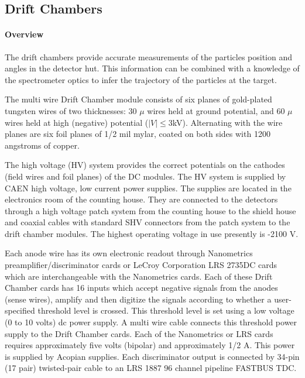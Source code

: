 \begin{obsolete}
\subsection{Drift Chambers}

\paragraph{Overview}

The drift chambers provide accurate measurements of the particles
position and angles in the detector hut. This information can be combined
with a knowledge of the spectrometer optics to infer the trajectory of the
particles at the target.

The multi wire Drift Chamber module consists of six planes of gold-plated
tungsten wires of two thicknesses: 30 $\mu$ wires held at ground
potential, and 60 $\mu$ wires held at high (negative) potential
($\left|V\right|\le3$kV).  Alternating with the wire planes are six
foil planes of 1/2 mil mylar, coated on both sides with 1200 angstroms
of copper.

The high voltage (HV) system provides the correct potentials on the
cathodes (field wires and foil planes) of the DC modules.  The HV
system is supplied by CAEN high voltage, low current power supplies.
The supplies are located in the electronics room of the counting
house. They are connected to the detectors through a high voltage patch
system from the counting house to the shield house
and coaxial cables with standard SHV connectors from the patch system
to the drift chamber modules.
The highest operating voltage in use presently is -2100 V.

Each anode wire has its own electronic readout through
Nanometrics preamplifier/discriminator
cards or LeCroy Corporation LRS 2735DC cards which are interchangeable
with the Nanometrics cards.  Each of these Drift Chamber cards has 16 inputs
which accept negative signals from the anodes (sense wires), amplify
and then digitize the signals according to whether a user-specified
threshold level is crossed.  This threshold level is set using a low
voltage (0 to 10 volts) dc power supply.  A
multi wire cable connects this threshold power supply to the Drift Chamber cards.
Each of the Nanometrics or LRS cards requires approximately five volts
(bipolar) and approximately 1/2 A.  This power is supplied by Acopian
supplies.  Each discriminator
output is connected by 34-pin (17 pair) twisted-pair cable to an LRS
1887 96 channel pipeline FASTBUS TDC.


\end{obsolete}
